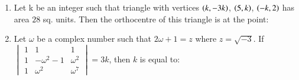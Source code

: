 \documentclass[journal,12pt,twocolumn]{IEEEtran}
\theoremstyle{remark}
\begin{document}
\begin{enumerate}
	\item Let k be an integer such that triangle with vertices $\left(k, -3k\right)$, $\left(5,k\right)$, $\left(-k,2\right)$ has area $28$ sq. units. Then the orthocentre of this triangle is at the point:
	\hfill{}
	\begin{enumerate}[label={(\alph*)}]
	    \begin{multicols}{2}
	     	\item $\brak{1,\frac{3}{4}}$ 
                \columnbreak
	    	\item $\brak{1,\frac{-3}{4}}$ 
            \end{multicols}
	\end{enumerate}


    \item Let $\omega$ be a complex number such that $2\omega + 1 = z$ where $z = \sqrt{-3}$. If
	    $\begin{vmatrix}1&1&1\\1&-\omega^2-1&\omega^2\\1&\omega^2&\omega^7\end{vmatrix} = 3k$, then $k$ is equal to:
	\hfill{}
	\begin{enumerate}[label={(\alph*)}]


	\end{enumerate}
\end{enumerate}
\end{document}

